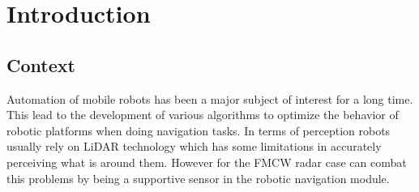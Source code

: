 \chapter{Introduction} \label{ch:introduction}









\section{Context}
Automation of mobile robots has been a major subject of interest for a long time. This lead to the development of various algorithms to optimize the behavior of robotic platforms when doing navigation tasks. In terms of perception robots usually rely on \ac{LiDAR} technology which has some limitations in accurately perceiving what is around them. However for the \ac{FMCW} \ac{radar} case can combat this problems by being a supportive sensor in the robotic navigation module.

